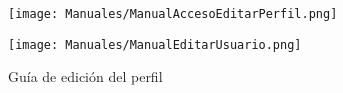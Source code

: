 \vspace{-15pt}
\begin{figure}[H]
    \centering
    \begin{minipage}{0.5\textwidth}
        \centering
        \texttt{[image: Manuales/ManualAccesoEditarPerfil.png]}
    \end{minipage}\hfill
    \begin{minipage}{0.5\textwidth}
        \centering
        \texttt{[image: Manuales/ManualEditarUsuario.png]}
    \end{minipage}\hfill
    \caption{Guía de edición del perfil}
    \label{man:editar_perfil}
\end{figure}